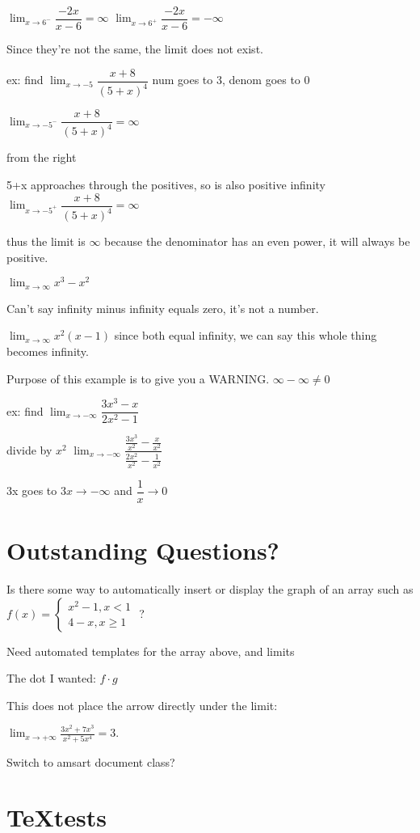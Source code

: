 \documentclass[12pt]{article}
\begin{document}
$\lim_{x\to 6^-}\dfrac{-2x}{x-6} = \infty$
$\lim_{x\to 6^+}\dfrac{-2x}{x-6} = -\infty$

Since they're not the same, the limit does not exist.


ex: find $\lim_{x \to -5}\dfrac{x+8}{(5+x)^4}$ num goes to 3, denom goes to 0

$\lim_{x \to -5^-}\dfrac{x+8}{(5+x)^4} = \infty$

from the right

5+x approaches through the positives, so is also positive infinity
$\lim_{x \to -5^+}\dfrac{x+8}{(5+x)^4} = \infty$

thus the limit is $\infty$
because the denominator has an even power, it will always be positive.

$\lim_{x\to\infty}x^3-x^2$

Can't say infinity minus infinity equals zero, it's not a number.

$\lim_{x\to\infty}x^2(x-1)$ since both equal infinity, we can say this whole thing becomes infinity. 

Purpose of this example is to give you a WARNING. $\infty - \infty \neq 0$

ex: find $\lim_{x\to - \infty}\dfrac{3x^3-x}{2x^2-1}$

divide by $x^2$
$\lim_{x\to - \infty}\dfrac{\frac{3x^3}{x^2}-\frac{x}{x^2}}{\frac{2x^2}{x^2}-\frac{1}{x^2}}$

3x goes to $3x \to -\infty$ and $\dfrac{1}{x} \to 0$


\section{Outstanding Questions?}

Is there some way to automatically insert or display the graph of an array such as $f(x) = \left\{\begin{array}{l}
x^2-1,x < 1\\
4-x, x \geq 1
\end{array} \right. $ ?

Need automated templates for the array above, and limits

The dot I wanted: $f\cdot g$

This does not place the arrow directly under the limit:


$ \lim_{x \to +\infty} \frac{3x^2 +7x^3}{x^2 +5x^4} = 3. $


Switch to amsart document class?

\section{\TeX tests}
\end{document}
